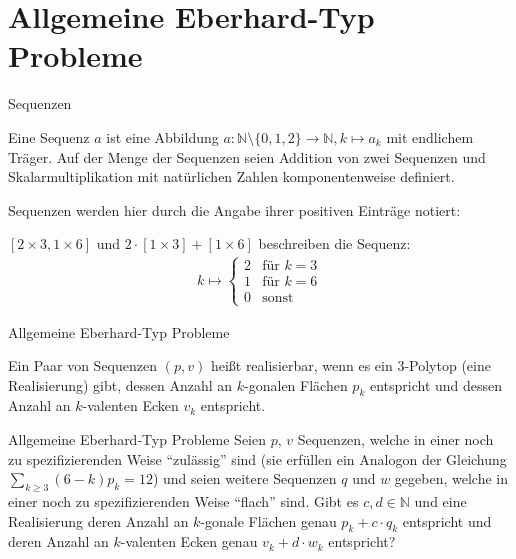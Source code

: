 \documentclass[10pt, notheorems]{beamer}
\newcommand{\set}[1]{\{ #1 \}}
\newcommand{\nats}{\mathbb{N}}
\newcommand{\hdef}[1]{\textcolor{darkred2}{#1}}
\begin{document}
\section{Allgemeine {\sc Eberhard}-Typ Probleme}
\begin{frame}{Sequenzen}
  \begin{definition}[Sequenz]
    Eine \hdef{Sequenz} $a$ ist eine Abbildung $a : \nats \setminus \set{0, 1, 2} \to \nats, k \mapsto a_k$ mit endlichem Träger. Auf der Menge der Sequenzen seien Addition von zwei Sequenzen und Skalarmultiplikation mit natürlichen Zahlen komponentenweise definiert.
  \end{definition}
  \pause
  Sequenzen werden hier durch die Angabe ihrer positiven Einträge notiert:
  \begin{example}
    $[2 \times 3, 1 \times 6]$ und $2 \cdot [1 \times 3] + [1 \times 6]$ beschreiben die Sequenz:
    \begin{align*}
      k \mapsto \begin{cases} 2 & \text{für } k = 3\\ 1 & \text{für } k = 6\\ 0 & \text{sonst}\end{cases}
    \end{align*}
  \end{example}
\end{frame}
\begin{frame}{Allgemeine {\sc Eberhard}-Typ Probleme}
  \begin{definition}
    Ein Paar von Sequenzen $(p, v)$ heißt realisierbar, wenn es ein $3$-Polytop (eine Realisierung) gibt, dessen Anzahl an $k$-gonalen Flächen $p_k$ entspricht und dessen Anzahl an $k$-valenten Ecken $v_k$ entspricht.
  \end{definition}
  \pause
  \begin{block}{Allgemeine {\sc Eberhard}-Typ Probleme}
    Seien $p$, $v$ Sequenzen, welche in einer noch zu spezifizierenden Weise ``zulässig'' sind (sie erfüllen ein Analogon der Gleichung $\sum_{k \geq 3} (6 - k) p_k = 12$) und seien weitere Sequenzen $q$ und $w$ gegeben, welche in einer noch zu spezifizierenden Weise ``flach'' sind. Gibt es $c, d \in \nats$ und eine Realisierung deren Anzahl an $k$-gonale Flächen genau $p_k + c \cdot q_k$ entspricht und deren Anzahl an $k$-valenten Ecken genau $v_k + d \cdot w_k$ entspricht?
  \end{block}
\end{frame}
\end{document}
